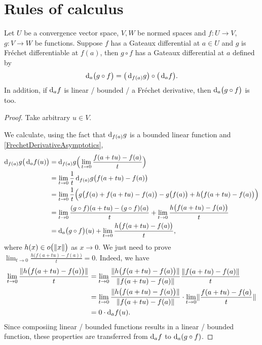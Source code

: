 \section{Rules of calculus}
\begin{proposition} \label{FrechetChainRule}
Let $U$ be a convergence vector space, $V,W$ be normed spaces and $f: U\to V$, $g: V\to W$ be functions. Suppose $f$ has a Gateaux differential at $a\in U$ and $g$ is Fréchet differentiable at $f(a)$, then $g\circ f$ has a Gateaux differential at $a$ defined by
\[ \operatorname{d \!}{_a}\big(g\circ f\big) = \big(\operatorname{d \!}{_{f(a)}}g\big) \circ \big(\operatorname{d \!}{_a}f\big). \]
In addition, if $\operatorname{d \!}{_a}f$ is linear / bounded / a Fréchet derivative, then $\operatorname{d \!}{_a}\big(g\circ f\big) $ is too.
\end{proposition}
\begin{proof}
Take arbitrary $u\in V$.

We calculate, using the fact that $\operatorname{d \!}{_{f(a)}g}$ is a bounded linear function and \ref{FrechetDerivativeAsymptotics},
\begin{align*}
\operatorname{d \!}{_{f(a)}g}\big(\operatorname{d \!}{_af}(u)\big) &= \operatorname{d \!}{_{f(a)}g}\Big(\lim_{t\to 0}\frac{f(a+tu) - f(a)}{t}\Big) \\
&= \lim_{t\to 0}\frac{1}{t}\operatorname{d \!}{_{f(a)}g}\big(f(a+tu) - f(a)\big) \\
&= \lim_{t\to 0}\frac{1}{t}\Big(g\big(f(a) + f(a+tu) - f(a)\big) - g\big(f(a)\big) + h\big(f(a+tu) - f(a)\big)\Big) \\
&= \lim_{t\to 0}\frac{(g\circ f)(a+tu) - (g\circ f)(a)}{t} + \lim_{t\to 0}\frac{h\big(f(a+tu) - f(a)\big)}{t} \\
&= \operatorname{d \!}{_a}\big(g\circ f\big)(u) + \lim_{t\to 0}\frac{h\big(f(a+tu) - f(a)\big)}{t},
\end{align*}
where $h(x) \in o\big(\lVert x\rVert\big)$ as $x\to 0$. We just need to prove $\lim_{t\to 0}\frac{h\big(f(a+tu) - f(a)\big)}{t} = 0$. Indeed, we have
\begin{align*}
\lim_{t\to 0}\frac{\lVert h\big(f(a+tu) - f(a)\big)\rVert}{t} &= \lim_{t\to 0}\frac{\lVert h\big(f(a+tu) - f(a)\big)\rVert}{\lVert f(a+tu) - f(a)\rVert}\frac{\lVert f(a+tu) - f(a)\rVert}{t} \\
&= \lim_{t\to 0}\frac{\lVert h\big(f(a+tu) - f(a)\big)\rVert}{\lVert f(a+tu) - f(a)\rVert}\cdot \lim_{t\to 0}\lVert\frac{f(a+tu) - f(a)}{t}\rVert \\
&= 0\cdot \operatorname{d \!}{_af}(u).
\end{align*}
Since composiing linear / bounded functions results in a linear / bounded function, these properties are transferred from $\operatorname{d \!}{_a}f$ to $\operatorname{d \!}{_a}(g\circ f)$.


\end{proof}
